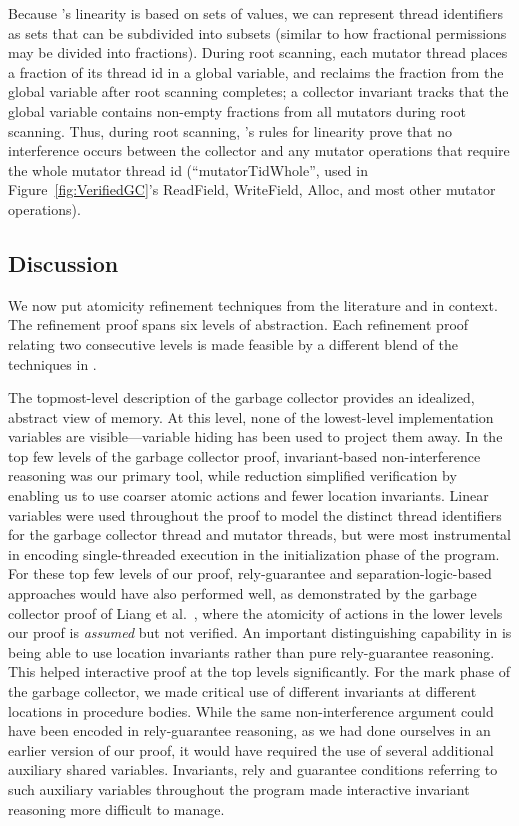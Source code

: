 Because \civl's linearity is based on sets of values,
we can represent thread identifiers as sets that can be subdivided into subsets
(similar to how fractional permissions may be divided into fractions).
During root scanning, each mutator thread places a fraction of its thread id in a global variable,
and reclaims the fraction from the global variable after root scanning completes;
a collector invariant tracks that the global variable contains non-empty fractions from all mutators during root scanning.
Thus, during root scanning, \civl's rules for linearity prove that no interference occurs
between the collector and any mutator operations that require the whole mutator thread id
(``mutatorTidWhole'', used in Figure~\ref{fig:VerifiedGC}'s ReadField, WriteField, Alloc,
and most other mutator operations).

\subsection{Discussion}
We now put atomicity refinement techniques from the literature and \civl in context.
The refinement proof spans six levels of abstraction. 
Each refinement proof relating two consecutive levels is made feasible by a different
blend of the techniques in \civl. 

The topmost-level description of the garbage collector provides an
idealized, abstract view of memory. 
At this level, none of the lowest-level implementation variables are
visible---variable hiding has been used to project them away. 
In the top few levels of the garbage collector proof, invariant-based
non-interference reasoning was our primary tool, while reduction
simplified verification by enabling us to use coarser atomic actions and fewer
location invariants.  
Linear variables were used throughout the proof to model the distinct
thread identifiers for the garbage collector thread and mutator
threads, but were most instrumental in encoding single-threaded
execution in the initialization phase of the program. 
For these top few levels of our proof, rely-guarantee and separation-logic-based
approaches would have also performed well, as demonstrated by the
garbage collector proof of Liang et al.~\cite{LiangRGSim}, where
the atomicity of actions in the lower levels our proof is {\em assumed} but not verified.
An important distinguishing capability in \civl is being able to use location invariants rather than pure rely-guarantee reasoning.
This helped interactive proof at the top levels significantly.
For the mark phase of the garbage collector, we made critical use of
different invariants at different locations in procedure bodies. 
While the same non-interference argument could have been encoded in
rely-guarantee reasoning, as we had done ourselves in an earlier
version of our proof, 
it would have required the use of several additional auxiliary shared variables. 
Invariants, rely and guarantee conditions referring to such auxiliary
variables throughout the program made interactive invariant reasoning more difficult to manage. 

